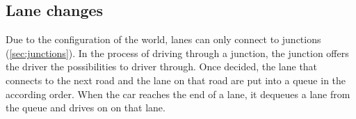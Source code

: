 \subsection{Lane changes}
\label{sec:laneChanges}

Due to the configuration of the world, lanes can only connect to junctions
(\ref{sec:junctions}). In the process of driving through a junction, the 
junction offers the driver the possibilities to driver through. Once decided,
the lane that connects to the next road and the lane on that road are put 
into a queue in the according order. When the car reaches the end of a lane, 
it dequeues a lane from the queue and drives on on that lane.

